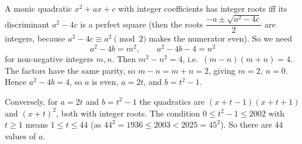 A monic quadratic $x^2+ax+c$ with integer coefficients has integer roots iff its discriminant $a^2-4c$ is a perfect square (then the roots $\dfrac{-a\pm\sqrt{a^2-4c}}{2}$ are integers, because $a^2-4c\equiv a^2\pmod 2$ makes the numerator even). So we need
\[
a^2-4b=m^2,\qquad a^2-4b-4=n^2
\]
for non-negative integers $m,n$. Then $m^2-n^2=4$, i.e.\ $(m-n)(m+n)=4$. The factors have the same parity, so $m-n=m+n=2$, giving $m=2$, $n=0$. Hence $a^2-4b=4$, so $a$ is even, $a=2t$, and $b=t^2-1$.

Conversely, for $a=2t$ and $b=t^2-1$ the quadratics are $(x+t-1)(x+t+1)$ and $(x+t)^2$, both with integer roots. The condition $0\le t^2-1\le2002$ with $t\ge1$ means $1\le t\le44$ (as $44^2=1936\le2003<2025=45^2$). So there are $\boxed{44}$ values of $a$.
